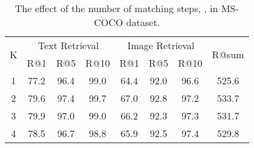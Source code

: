 \documentclass{midl}
\begin{document}
\begin{table}[]
\centering
\caption{The effect of the number of matching steps, , in MS-COCO dataset.}
\label{table-iteration_exp}
\begin{tabular}{@{}cccccccc@{}}
\toprule
\multirow{2}{*}{K} & \multicolumn{3}{c}{Text Retrieval} & \multicolumn{3}{c}{Image Retrieval} & \multirow{2}{*}{R@sum} \\
                   & R@1        & R@5       & R@10      & R@1        & R@5        & R@10      &                        \\ \midrule
1                  & 77.2       & 96.4      & 99.0      & 64.4       & 92.0       & 96.6      & 525.6                  \\
2                  & 79.6       & 97.4      & 99.7      & 67.0       & 92.8       & 97.2      & 533.7                  \\
3                  & 79.9       & 97.0      & 99.0      & 66.2       & 92.3       & 97.3      & 531.7                  \\
4                  & 78.5       & 96.7      & 98.8      & 65.9       & 92.5       & 97.4      & 529.8                  \\ \bottomrule
\end{tabular}\end{table}
\end{document}
